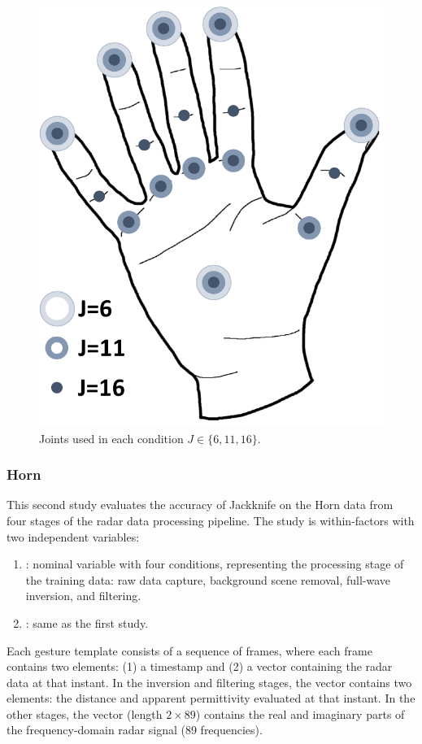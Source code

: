 \begin{figure}[tb]
    \centering
    \includegraphics[width=.35\linewidth]{Figures/RadarExperiments/Sensors/lmc-joints.pdf}
    \caption{Joints used in each condition $J{\in}\{6,11,16\}$.}
    \label{fig:radar-experiments:lmc-joints}
\end{figure}

\subsubsection{Horn} \label{sec:radar-experiments:sensors:protocol:horn}
This second study evaluates the accuracy of Jackknife on the Horn data from four stages of the radar data processing pipeline. The study is within-factors with two independent variables:
\begin{enumerate}
    \item {}: nominal variable with four conditions, representing the processing stage of the training data: raw data capture, background scene removal, full-wave inversion, and filtering.
    \item {}: same as the first study.
\end{enumerate}
Each gesture template consists of a sequence of frames, where each frame contains two elements: (1) a timestamp and (2) a vector containing the radar data at that instant. In the inversion and filtering stages, the vector contains two elements: the distance and apparent permittivity evaluated at that instant. In the other stages, the vector (length $2 \times 89$) contains the real and imaginary parts of the frequency-domain radar signal (89 frequencies). 


